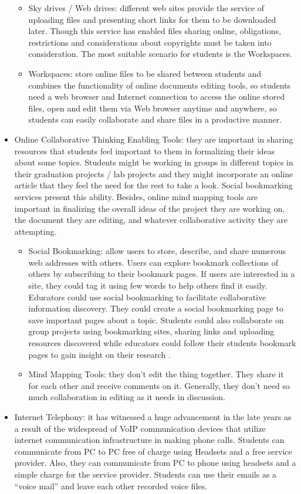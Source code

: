 \documentclass[12pt,a4paper,final,twoside,onecolumn,titlepage]{book}
\begin{document}
\begin{itemize}
\begin{itemize}
\item Sky drives / Web drives: different web sites provide the service of uploading files and presenting short links for them to be downloaded later. Though this service has enabled files sharing online, obligations, restrictions and considerations about copyrights must be taken into consideration. The most suitable scenario for students is the Workspaces.
\item Workspaces: store online files to be shared between  students and combines the functionality of online documents editing tools, so students need a web browser and Internet connection to access the online stored files, open and edit them via Web browser anytime and anywhere, so students can easily collaborate and share files in a productive manner.
\end{itemize}
\item Online Collaborative Thinking Enabling Tools: they are important in sharing resources that students feel important to them in formalizing their ideas about some topics. Students might be working in groups in different topics in their graduation projects / lab projects and they might incorporate an online article that they feel the need for the rest to take a look. Social bookmarking services present this ability. Besides, online mind mapping tools are important in finalizing the overall ideas of the project they are working on, the document they are editing, and whatever collaborative activity they are attempting.
\begin{itemize}
\item Social Bookmarking: allow users to store, describe, and share numerous web addresses with others. Users can explore bookmark collections of others by subscribing to their bookmark pages. If users are interested in a site, they could tag it using few words to help others find it easily. Educators could use social bookmarking to facilitate collaborative information discovery. They could create a social bookmarking page to save important pages about a topic. Students could also collaborate on group projects using bookmarking sites, sharing links and uploading resources discovered while educators could follow their students bookmark pages to gain insight on their research \cite{W10}.
\item Mind Mapping Tools: they don’t edit the thing together. They share it for each other and receive comments on it. Generally, they don’t need so much collaboration in editing as it needs in discussion.
\end{itemize}
\item Internet Telephony: it has witnessed a huge advancement in the late years as a result of the widespread of VoIP communication devices that utilize internet communication infrastructure in making phone calls. Students can communicate from PC to PC free of charge using Headsets and a free service provider. Also, they can communicate from PC to phone using headsets and a simple charge for the service provider. Students can use their emails as a “voice mail” and leave each other recorded voice files.
\end{itemize}
\end{document}
